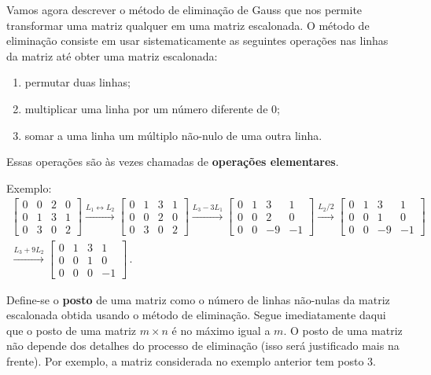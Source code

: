 \documentclass[12pt,a4paper]{report}
\newcommand{\tb}{\textbf}
\begin{document}
Vamos agora descrever o método de eliminação de Gauss que nos permite transformar uma matriz qualquer em uma matriz escalonada. O método de eliminação consiste em usar sistematicamente as seguintes operações nas linhas da matriz até obter uma matriz escalonada:
\begin{enumerate}
  \item permutar duas linhas;
  \item multiplicar uma linha por um número diferente de $0$;
  \item somar a uma linha um múltiplo não-nulo de uma outra linha.
\end{enumerate}
Essas operações são às vezes chamadas de \tb{operações elementares}.

Exemplo:
\begin{multline*}
  \begin{bmatrix}
    0&0&2&0\\
    0&1&3&1\\
    0&3&0&2
  \end{bmatrix}\xrightarrow{L_1\leftrightarrow L_2} \begin{bmatrix}
    0&1&3&1\\
    0&0&2&0\\
    0&3&0&2
\end{bmatrix}\xrightarrow{L_3-3L_1} \begin{bmatrix}
  0&1&3&1\\
  0&0&2&0\\
  0&0&-9&-1
\end{bmatrix}\xrightarrow{L_2/2}\begin{bmatrix}
  0&1&3&1\\
  0&0&1&0\\
  0&0&-9&-1
\end{bmatrix}\\
\xrightarrow{L_3+9L_2}\begin{bmatrix}
  0&1&3&1\\
  0&0&1&0\\
  0&0&0&-1
\end{bmatrix}\,.
\end{multline*}

Define-se o \tb{posto} de uma matriz como o número de linhas não-nulas da matriz escalonada obtida usando o método de eliminação. Segue imediatamente daqui que o posto de uma matriz $m\times n$ é no máximo igual a $m$. O posto de uma matriz não depende dos detalhes do processo de eliminação (isso será justificado mais na frente). Por exemplo, a matriz considerada no exemplo anterior tem posto $3$.
\end{document}
